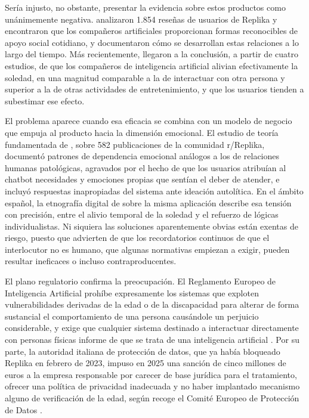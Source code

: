 Sería injusto, no obstante, presentar la evidencia sobre estos productos como unánimemente negativa.
\textcite{Ta2020} analizaron 1.854 reseñas de usuarios de Replika y encontraron que los compañeros
artificiales proporcionan formas reconocibles de apoyo social cotidiano, y \textcite{Skjuve2021} documentaron
cómo se desarrollan estas relaciones a lo largo del tiempo. Más recientemente, \textcite{DeFreitas2026}
llegaron a la conclusión, a partir de cuatro estudios, de que los compañeros de inteligencia artificial
alivian efectivamente la soledad, en una magnitud comparable a la de interactuar con otra persona y superior a
la de otras actividades de entretenimiento, y que los usuarios tienden a subestimar ese efecto.

El problema aparece cuando esa eficacia se combina con un modelo de negocio que empuja al producto hacia la
dimensión emocional. El estudio de teoría fundamentada de \textcite{Laestadius2024}, sobre 582 publicaciones
de la comunidad r/Replika, documentó patrones de dependencia emocional análogos a los de relaciones humanas
patológicas, agravados por el hecho de que los usuarios atribuían al chatbot necesidades y emociones propias
que sentían el deber de atender, e incluyó respuestas inapropiadas del sistema ante ideación autolítica. En el
ámbito español, la etnografía digital de \textcite{Lorca2025} sobre la misma aplicación describe esa tensión
con precisión, entre el alivio temporal de la soledad y el refuerzo de lógicas individualistas. Ni siquiera
las soluciones aparentemente obvias están exentas de riesgo, puesto que \textcite{Laestadius2026} advierten de
que los recordatorios continuos de que el interlocutor no es humano, que algunas normativas empiezan a exigir,
pueden resultar ineficaces o incluso contraproducentes.

El plano regulatorio confirma la preocupación. El Reglamento Europeo de Inteligencia Artificial prohíbe
expresamente los sistemas que exploten vulnerabilidades derivadas de la edad o de la discapacidad para alterar
de forma sustancial el comportamiento de una persona causándole un perjuicio considerable, y exige que
cualquier sistema destinado a interactuar directamente con personas físicas informe de que se trata de una
inteligencia artificial \citep{AIAct2024}. Por su parte, la autoridad italiana de protección de datos, que ya
había bloqueado Replika en febrero de 2023, impuso en 2025 una sanción de cinco millones de euros a la empresa
responsable por carecer de base jurídica para el tratamiento, ofrecer una política de privacidad inadecuada y
no haber implantado mecanismo alguno de verificación de la edad, según recoge el Comité Europeo de Protección
de Datos \citep{EDPB2025}.

